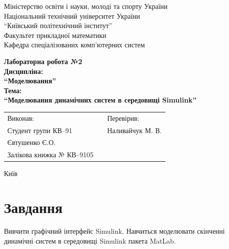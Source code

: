 \documentclass[a4paper, 10pt]{article}
\begin{document}
\begin{titlepage}
\begin{center}
\large{
Міністерство освіти і науки, молоді та спорту України\\
Національний технічний університет України\\
``Київський політехнічний інститут''\\
Факультет прикладної математики\\
Кафедра спеціалізованих комп’ютерних систем\\
}

\vfill

\large{\bf{
Лабораторна робота №2\\
Дисципліна:\\
``Моделювання''\\
Тема:\\
``Моделювання динамічних систем в середовищі Simulink''\\
}}

\vfill

\begin{table}[h]
\centering
\begin{tabular}{lp{4cm}l}
Виконав:&&Перевірив:\\
Студент групи КВ--91&&Наливайчук М. В.\\
Євтушенко Є.О.&&\\
Залікова книжка № КВ--9105&&\\
\end{tabular}
\end{table}

\vfill

Київ \the\year
\end{center}
\end{titlepage}
\newpage

\section{Завдання}
Вивчити графічний інтерфейс Simulink. Навчиться моделювати скінченні динамічні систем в середовищі Simulink пакета MatLab.
\end{document}
